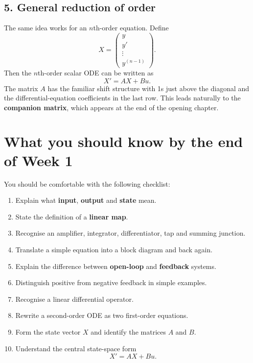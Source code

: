 \documentclass[11pt,a4paper]{article}
\begin{document}
\subsection*{5. General reduction of order}
The same idea works for an $n$th-order equation. Define
\[
X=\begin{pmatrix}
y\\y'\\\vdots\\y^{(n-1)}
\end{pmatrix}.
\]
Then the $n$th-order scalar ODE can be written as
\[
\boxed{X'=AX+Bu}.
\]
The matrix $A$ has the familiar shift structure with 1s just above the diagonal and the differential-equation coefficients in the last row. This leads naturally to the \textbf{companion matrix}, which appears at the end of the opening chapter.

\section*{What you should know by the end of Week 1}
You should be comfortable with the following checklist:

\begin{enumerate}[leftmargin=1.8em]
\item Explain what \textbf{input}, \textbf{output} and \textbf{state} mean.
\item State the definition of a \textbf{linear map}.
\item Recognise an amplifier, integrator, differentiator, tap and summing junction.
\item Translate a simple equation into a block diagram and back again.
\item Explain the difference between \textbf{open-loop} and \textbf{feedback} systems.
\item Distinguish positive from negative feedback in simple examples.
\item Recognise a linear differential operator.
\item Rewrite a second-order ODE as two first-order equations.
\item Form the state vector $X$ and identify the matrices $A$ and $B$.
\item Understand the central state-space form
\[
\boxed{X'=AX+Bu}.
\]
\end{enumerate}
\end{document}
